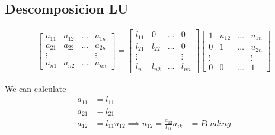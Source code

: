 \documentclass{article}
\theoremstyle{problemstyle}
\begin{document}
  \subsection{Descomposicion LU}

  \begin{align*}
    \begin{bmatrix}
      a_{11} & a_{12} & \dots & a_{1n}\\
      a_{21} & a_{22} &\dots & a_{2n}\\
      \vdots & & &\vdots\\
      a_{n1} & a_{n2} & \dots & a_{nn}
    \end{bmatrix} = 
    \begin{bmatrix}
      l_{11} & 0 & \dots & 0\\
      l_{21} & l_{22} &\dots & 0\\
      \vdots & & &\vdots\\
      l_{n1} & l_{n2} & \dots & l_{nn}
    \end{bmatrix}  
    \begin{bmatrix}
      1 & u_{12} & \dots & u_{1n}\\
      0 & 1&\dots & u_{2n}\\
      \vdots & & &\vdots\\
      0 & 0 & \dots & 1
    \end{bmatrix}  
  \end{align*}

  We can calculate 
\begin{align*}
  a_{11} &= l_{11}\\
  a_{21} &= l_{21}\\
  a_{12} &= l_{11}u_{12} \implies u_{12} = \displaystyle\frac{a_{12}}{l_{11}}
  a_{ik} &= Pending
\end{align*}

  
\end{document}
